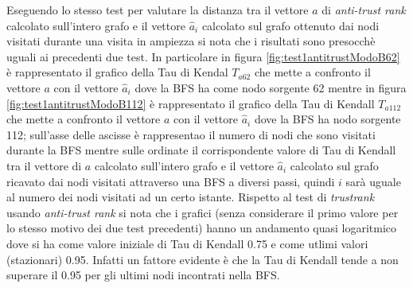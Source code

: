 Eseguendo lo stesso test per valutare la distanza tra il vettore \(a\) di \textit{anti-trust rank} calcolato sull'intero grafo e il vettore \(\hat{a}_i\) calcolato sul grafo ottenuto dai nodi visitati durante una visita in ampiezza si nota che i risultati sono presocchè uguali ai precedenti due test. In particolare in figura \ref{fig:test1antitrustModoB62} è rappresentato il grafico della Tau di Kendal \(T_{a62}\) che mette a confronto il vettore \(a\) con il vettore \(\hat{a}_i\) dove la BFS ha come nodo sorgente 62 mentre in figura \ref{fig:test1antitrustModoB112} è rappresentato il grafico della Tau di Kendall \(T_{a112}\) che mette a confronto il vettore \(a\) con il vettore \(\hat{a}_i\) dove la BFS ha nodo sorgente 112; sull'asse delle ascisse è rappresentao il numero di nodi che sono visitati durante la BFS mentre sulle ordinate il corrispondente valore di Tau di Kendall tra il vettore di \(a\) calcolato sull'intero grafo e il vettore \(\hat{a}_i\) calcolato sul grafo ricavato dai nodi visitati 
attraverso una BFS a diversi passi, quindi \(i\) sarà uguale al numero dei nodi visitati ad un certo istante. Rispetto al test di \textit{trustrank} usando \textit{anti-trust rank} si nota che i grafici (senza considerare il primo valore per lo stesso motivo dei due test precedenti) hanno un andamento quasi logaritmico dove si ha come valore iniziale di Tau di Kendall 0.75 e come utlimi valori (stazionari) 0.95. Infatti un fattore evidente è che la Tau di Kendall tende a non superare il 0.95 per gli ultimi nodi incontrati nella BFS.

